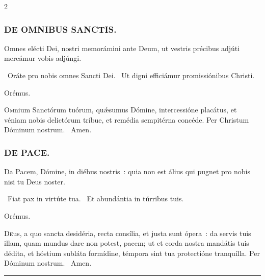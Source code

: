 \documentclass[9pt,twoside]{extarticle}
\begin{document}
\begin{multicols}{2}
{{{\subsubsection*{\center \textsc{DE OMNIBUS SANCTIS.}}
\begin{tightlist}{}
\item {} Omnes elécti Dei, nostri memorámini ante Deum, ut vestris précibus adjúti mereámur vobis adjúngi.
\item {}~Oráte pro nobis omnes Sancti Dei. ~Ut digni efficiámur promissiónibus Christi.
\item Orémus. \hfill {}
\end{tightlist}
\lettrine{O}mnium Sanctórum tuórum, quǽsumus Dómine, intercessióne placátus, et véniam nobis delictórum tríbue, et remédia sempitérna concéde. Per Christum Dóminum nostrum. ~Amen.

\subsubsection*{\center \textsc{DE PACE.}}
\begin{tightlist}{}
\item {} Da Pacem, Dómine, in diébus nostris~: quia non est álius qui pugnet pro nobis nisi tu Deus noster.
\item {}~Fiat pax in virtúte tua. ~Et abundántia in túrribus tuis.
\item Orémus. \hfill {}
\end{tightlist}
\lettrine{D}eus, a quo sancta desidéria, recta consília, et justa sunt ópera~: da servis tuis illam, quam mundus dare non potest, pacem; ut et corda nostra mandátis tuis dédita, et hóstium subláta formídine, témpora sint tua protectióne tranquílla. Per Dóminum nostrum. ~Amen.

\begin{center}\textcolor{red}{\rule{\linewidth}{0.5pt}} \end{center}

}}}
\end{multicols}
\end{document}
